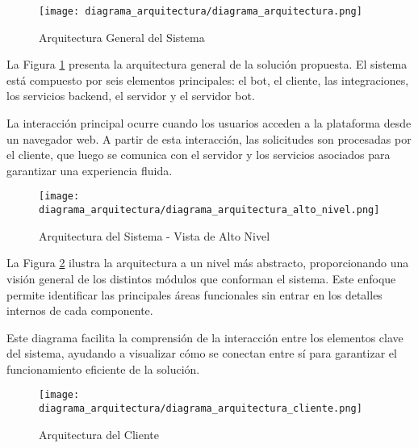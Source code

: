 
\begin{figure}[htbp]
    \centering
    \texttt{[image: diagrama\_arquitectura/diagrama\_arquitectura.png]}
    \caption{Arquitectura General del Sistema}
    \label{fig:diagrama_arquitectura}
\end{figure}

La Figura \ref{fig:diagrama_arquitectura} presenta la arquitectura general de la
solución propuesta. El sistema está compuesto por seis elementos principales: el
bot, el cliente, las integraciones, los servicios backend, el servidor y el
servidor bot. 

La interacción principal ocurre cuando los usuarios acceden a la plataforma
desde un navegador web. A partir de esta interacción, las solicitudes son
procesadas por el cliente, que luego se comunica con el servidor y los servicios
asociados para garantizar una experiencia fluida.

\begin{figure}[htbp]
    \centering
    \texttt{[image: diagrama\_arquitectura/diagrama\_arquitectura\_alto\_nivel.png]}
    \caption{Arquitectura del Sistema - Vista de Alto Nivel}
    \label{fig:diagrama_arquitectura_alto_nivel}
\end{figure}

La Figura \ref{fig:diagrama_arquitectura_alto_nivel} ilustra la arquitectura a
un nivel más abstracto, proporcionando una visión general de los distintos
módulos que conforman el sistema. Este enfoque permite identificar las
principales áreas funcionales sin entrar en los detalles internos de cada
componente. 

Este diagrama facilita la comprensión de la interacción entre los elementos
clave del sistema, ayudando a visualizar cómo se conectan entre sí para
garantizar el funcionamiento eficiente de la solución.

\begin{figure}[htbp]
    \centering
    \texttt{[image: diagrama\_arquitectura/diagrama\_arquitectura\_cliente.png]}
    \caption{Arquitectura del Cliente}
    \label{fig:diagrama_arquitectura_cliente}
\end{figure}

